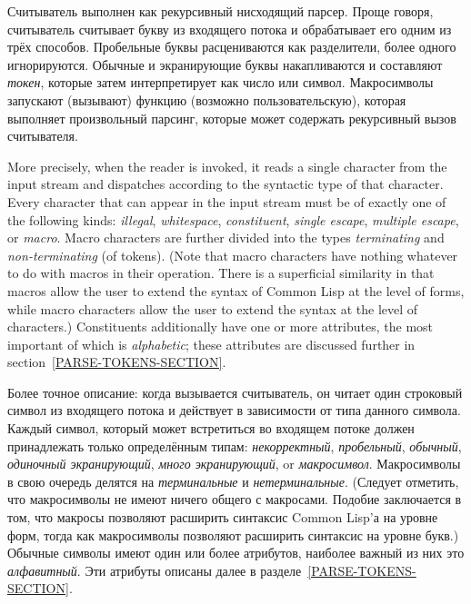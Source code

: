 Считыватель выполнен как рекурсивный нисходящий парсер.  Проще говоря,
считыватель считывает букву из входящего потока и обрабатывает его
одним из трёх способов.  Пробельные буквы расцениваются как
разделители, более одного игнорируются. Обычные и экранирующие буквы
накапливаются и составляют \emph{токен}, которые затем интерпретирует как число
или символ. Макросимволы запускают (вызывают) функцию (возможно
пользовательскую), которая выполняет произвольный парсинг, которые может
содержать рекурсивный вызов считывателя.

More precisely,
when the reader is invoked, it reads a single character from the input stream
and dispatches according to the syntactic type of that character.
Every character that can appear in the input stream
must be of exactly one of the following kinds:
\emph{illegal},
\emph{whitespace},
\emph{constituent},
\emph{single escape},
\emph{multiple escape}, or
\emph{macro}.
Macro characters are further divided
into the types \emph{terminating} and \emph{non-terminating} (of tokens).
(Note that macro characters have nothing whatever to do with macros
in their operation.  There is a superficial similarity in that macros allow
the user to extend the syntax of Common Lisp at the level of forms,
while macro characters allow the user to extend the syntax at the
level of characters.)
Constituents additionally have one or more attributes,
the most important of which is \emph{alphabetic}; these attributes are discussed
further in section~\ref{PARSE-TOKENS-SECTION}.

Более точное описание: когда вызывается считыватель, он читает один строковый
символ из входящего потока и действует в зависимости от типа данного символа.
Каждый символ, который может встретиться во входящем потоке должен принадлежать
только определённым типам:
\emph{некорректный},
\emph{пробельный},
\emph{обычный},
\emph{одиночный экранирующий},
\emph{много экранирующий}, or
\emph{макросимвол}.
Макросимволы в свою очередь делятся на \emph{терминальные} и
\emph{нетерминальные}. (Следует отметить, что макросимволы не имеют ничего
общего с макросами. Подобие заключается в том, что макросы позволяют расширить
синтаксис Common Lisp'а на уровне форм, тогда как макросимволы позволяют
расширить синтаксис на уровне букв.)
Обычные символы имеют один или более атрибутов, наиболее важный из них это
\emph{алфавитный}. Эти атрибуты описаны далее в разделе~\ref{PARSE-TOKENS-SECTION}.

